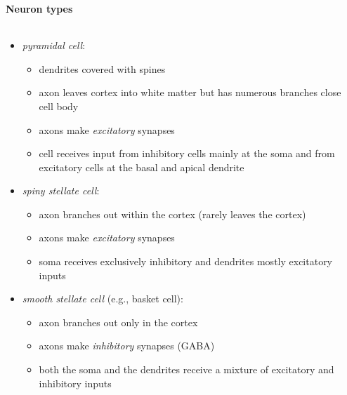 \documentclass[8pt,t,usepdftitle=false]{beamer}
\def\figpath{\src/figures}
\begin{document}
\begin{frame}[plain]
  \frametitle{\ttl}
  \framesubtitle{Neuron types}
  \begin{columns}
    \begin{column}{0.5\linewidth}
      \vspace*{-2ex}
      \begin{itemize}
      \item<1-> \emph{pyramidal cell}:
      \begin{itemize}
      \item dendrites covered with spines
      \item axon leaves cortex into white matter but has numerous branches close cell body
      \item axons make \emph{excitatory} synapses
      \item cell receives input from inhibitory cells mainly at the soma and from excitatory cells at the basal and apical dendrite
      \end{itemize}
      \item<2-> \emph{spiny stellate cell}:
      \begin{itemize}
      \item axon branches out within the cortex (rarely leaves the cortex)
      \item axons make \emph{excitatory} synapses
      \item soma receives exclusively inhibitory and dendrites mostly excitatory inputs
      \end{itemize}
      \item<3-> \emph{smooth stellate cell} (e.g., basket cell):
      \begin{itemize}
      \item axon branches out only in the cortex
      \item axons make \emph{inhibitory} synapses (GABA)
      \item both the soma and the dendrites receive a mixture of excitatory and inhibitory inputs
      \end{itemize}
    \end{itemize}           
    \end{column}
    \begin{column}{0.5\linewidth}
      \begin{center}
        \vspace*{-0.5cm}
\end{center}
\end{column}
\end{columns}
\end{frame}
\end{document}
